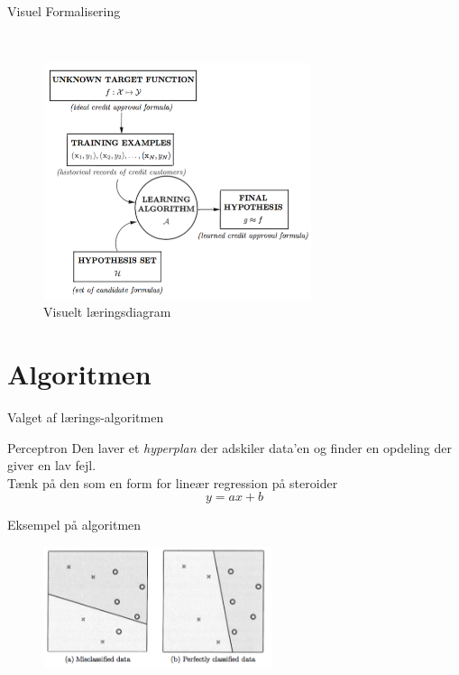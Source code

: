 \documentclass[12pt,t]{beamer}
\begin{document}
    \begin{frame}[c]{Visuel Formalisering}
        \begin{block}{~}
            \begin{figure}[h!]
                \caption{Visuelt læringsdiagram}
                \centering
                \includegraphics[width=0.7\textwidth]{include/dia.png}
            \end{figure}
        \end{block}
    \end{frame}


\section{Algoritmen}
\frame{\tableofcontents[currentsection]}

    \begin{frame}[t]{Valget af lærings-algoritmen}
        \begin{block}{Perceptron}
            Den laver et \emph{hyperplan} der adskiler data'en og finder en
            opdeling der giver en \alert{lav fejl}. \\
            \pause
            Tænk på den som en form for lineær regression på steroider
            $$
                y = ax + b
            $$
        \end{block}
        \pause
        \begin{block}{Eksempel på algoritmen}
            \begin{figure}[h!]
                \centering
                \includegraphics[width=0.6\textwidth]{include/per1.png}
            \end{figure}
        \end{block}
    \end{frame}
\end{document}
